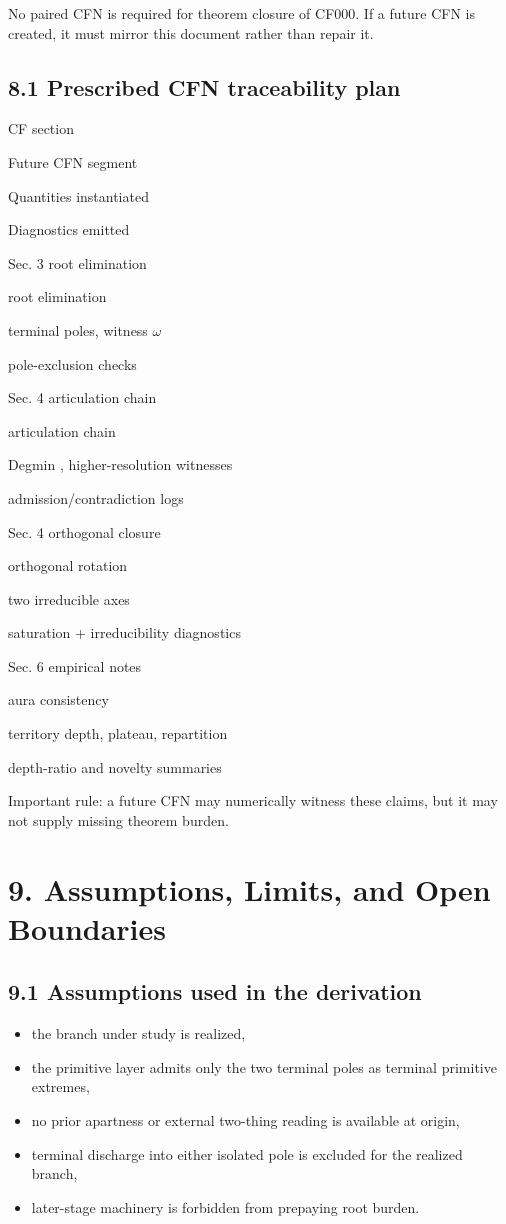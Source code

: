 \documentclass[11pt]{article}
\begin{document}
No paired CFN is required for theorem closure of CF000. If a future CFN is created, it must mirror this document rather than repair it.

\subsection{8.1 Prescribed CFN traceability plan}\label{prescribed-cfn-traceability-plan}

CF section

Future CFN segment

Quantities instantiated

Diagnostics emitted

Sec. 3 root elimination

root elimination

terminal poles, witness $\omega$

pole-exclusion checks

Sec. 4 articulation chain

articulation chain

Degmin , higher-resolution witnesses

admission/contradiction logs

Sec. 4 orthogonal closure

orthogonal rotation

two irreducible axes

saturation + irreducibility diagnostics

Sec. 6 empirical notes

aura consistency

territory depth, plateau, repartition

depth-ratio and novelty summaries

Important rule: a future CFN may numerically witness these claims, but it may not supply missing theorem burden.

\section{9. Assumptions, Limits, and Open Boundaries}\label{assumptions-limits-and-open-boundaries}

\subsection{9.1 Assumptions used in the derivation}\label{assumptions-used-in-the-derivation}

\begin{itemize}
\item
  the branch under study is realized,
\item
  the primitive layer admits only the two terminal poles as terminal primitive extremes,
\item
  no prior apartness or external two-thing reading is available at origin,
\item
  terminal discharge into either isolated pole is excluded for the realized branch,
\item
  later-stage machinery is forbidden from prepaying root burden.
\end{itemize}
\end{document}
